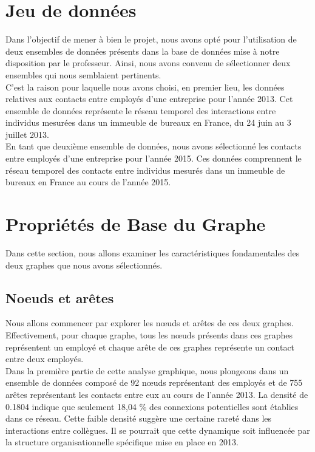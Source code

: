 \documentclass{article}
\begin{document}
\section{Jeu de données}

Dans l'objectif de mener à bien le projet, nous avons opté pour l'utilisation de deux ensembles de données présents dans la base de données mise à notre disposition par le professeur. Ainsi, nous avons convenu de sélectionner deux ensembles qui nous semblaient pertinents. \\

C'est la raison pour laquelle nous avons choisi, en premier lieu, les données relatives aux contacts entre employés d'une entreprise pour l'année 2013. Cet ensemble de données représente le réseau temporel des interactions entre individus mesurées dans un immeuble de bureaux en France, du 24 juin au 3 juillet 2013. \\

En tant que deuxième ensemble de données, nous avons sélectionné les contacts entre employés d'une entreprise pour l'année 2015. Ces données comprennent le réseau temporel des contacts entre individus mesurés dans un immeuble de bureaux en France au cours de l'année 2015.

\section{Propriétés de Base du Graphe}

Dans cette section, nous allons examiner les caractéristiques fondamentales des deux graphes que nous avons sélectionnés.

\subsection{Noeuds et arêtes}

\noindent
Nous allons commencer par explorer les nœuds et arêtes de ces deux graphes. \\

Effectivement, pour chaque graphe, tous les nœuds présents dans ces graphes représentent un employé et chaque arête de ces graphes représente un contact entre deux employés. \\

Dans la première partie de cette analyse graphique, nous plongeons dans un ensemble de données composé de 92 nœuds représentant des employés et de 755 arêtes représentant les contacts entre eux au cours de l'année 2013. La densité de 0.1804 indique que seulement 18,04 \% des connexions potentielles sont établies dans ce réseau. Cette faible densité suggère une certaine rareté dans les interactions entre collègues. Il se pourrait que cette dynamique soit influencée par la structure organisationnelle spécifique mise en place en 2013. \\
\end{document}
